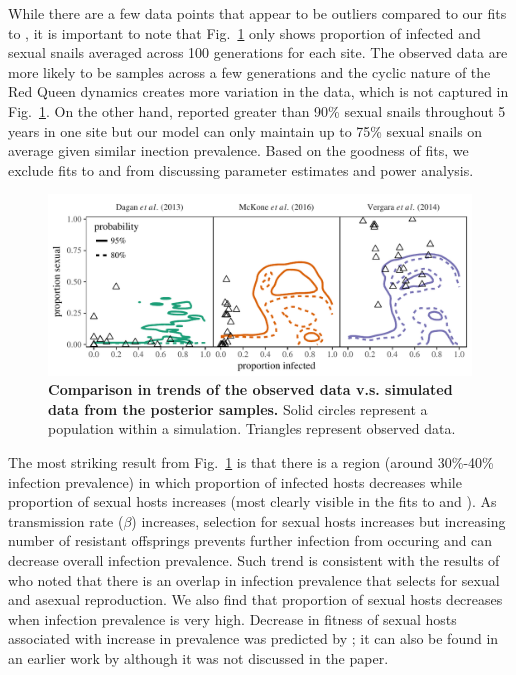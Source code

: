 \documentclass{article}\usepackage[]{graphicx}\usepackage[]{color}
\newcommand{\fref}[1]{Fig.~\ref{fig:#1}}
\begin{document}
While there are a few data points that appear to be outliers compared to our fits to \cite{vergara2014infection},
it is important to note that \fref{ivs} only shows proportion of infected and sexual snails averaged across 100 generations for each site.
The observed data are more likely to be samples across a few generations and the cyclic nature of the Red Queen dynamics creates more variation in the data, which is not captured in \fref{ivs}.
On the other hand, \cite{vergara2014infection} reported greater than 90\% sexual snails throughout 5 years in one site but our model can only maintain up to 75\% sexual snails on average given similar inection prevalence.
Based on the goodness of fits, we exclude fits to \cite{dagan2013clonal} and \cite{mckone2016fine} from discussing parameter estimates and power analysis.

\begin{figure}[!ht]
\includegraphics[width=\textwidth]{../fig/simulated_data.pdf}
\caption{{\bf Comparison in trends of the observed data v.s. simulated data from the posterior samples.}
Solid circles represent a population within a simulation. Triangles represent observed data.}
\label{fig:ivs}
\end{figure}

The most striking result from \fref{ivs} is that there is a region (around 30\%-40\% infection prevalence) in which proportion of infected hosts decreases while proportion of sexual hosts increases (most clearly visible in the fits to \cite{mckone2016fine} and \cite{vergara2014infection}).
As transmission rate ($\beta$) increases, selection for sexual hosts increases but increasing number of resistant offsprings prevents further infection from occuring and can decrease overall infection prevalence.
Such trend is consistent with the results of \cite{lively2001trematode} who noted that there is an overlap in infection prevalence that selects for sexual and asexual reproduction.
We also find that proportion of sexual hosts decreases when infection prevalence is very high.
Decrease in fitness of sexual hosts associated with increase in prevalence was predicted by \cite{ashby2015diversity}; 
it can also be found in an earlier work by \cite{lively2010epidemiological} although it was not discussed in the paper.
\end{document}
